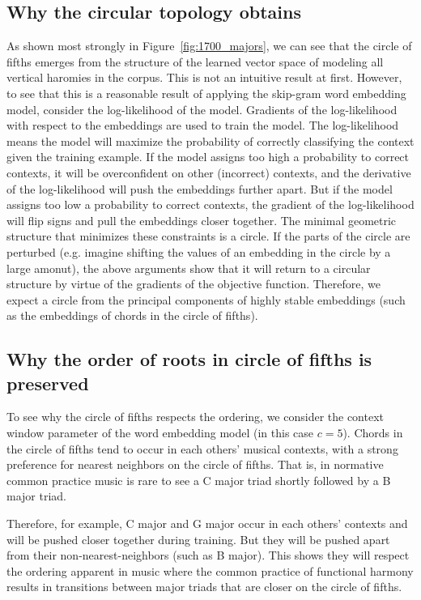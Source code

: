 
\subsection{Why the circular topology obtains}
As shown most strongly in Figure~\ref{fig:1700_majors}, we can see that the circle of fifths emerges from the structure of the learned vector space of modeling all vertical haromies in the corpus. This is not an intuitive result at first.
However, to see that this is a reasonable result of applying the skip-gram word embedding model, consider the log-likelihood of the model. Gradients of the log-likelihood with respect to the embeddings are used to train the model.
The log-likelihood means the model will maximize the probability of correctly classifying the context given the training example.
If the model assigns too high a probability to correct contexts, it will be overconfident on other (incorrect) contexts, and the derivative of the log-likelihood will push the embeddings further apart.
But if the model assigns too low a probability to correct contexts, the gradient of the log-likelihood will flip signs and pull the embeddings closer together.
The minimal geometric structure that minimizes these constraints is a circle. If the parts of the circle are perturbed (e.g. imagine shifting the values of an embedding in the circle by a large amonut), the above arguments show that it will return to a circular structure by virtue of the gradients of the objective function.
Therefore, we expect a circle from the principal components of highly stable embeddings (such as the embeddings of chords in the circle of fifths).
\subsection{Why the order of roots in circle of fifths is preserved}
To see why the circle of fifths respects the ordering, we consider the context window parameter of the word embedding model (in this case $c = 5$). Chords in the circle of fifths tend to occur in each others' musical contexts, with a strong preference for nearest neighbors on the circle of fifths. That is, in normative common practice music is rare to see a C major triad shortly followed by a B major triad.

Therefore, for example, C major and G major occur in each others' contexts and will be pushed closer together during training. But they will be pushed apart from their non-nearest-neighbors (such as B major). This shows they will respect the ordering apparent in music where the common practice of functional harmony results in transitions between major triads that are closer on the circle of fifths.

